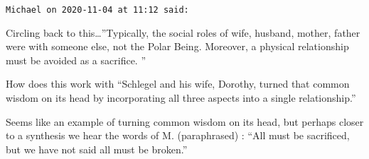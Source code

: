 \begin{footnotesize}
\begin{sffamily}
\hfill

\texttt{Michael on 2020-11-04 at 11:12 said: }

Circling back to this…”Typically, the social roles of wife, husband, mother, father were with someone else, not the Polar Being. Moreover, a physical relationship must be avoided as a sacrifice. ”

How does this work with “Schlegel and his wife, Dorothy, turned that common wisdom on its head by incorporating all three aspects into a single relationship.”

Seems like an example of turning common wisdom on its head, but perhaps closer to a synthesis we hear the words of M. (paraphrased) : “All must be sacrificed, but we have not said all must be broken.”


\end{sffamily}\end{footnotesize}
